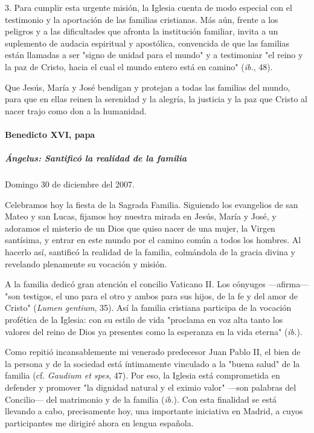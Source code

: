 \documentclass[]{article}
\let\oldparagraph\paragraph
\renewcommand{\paragraph}[1]{\oldparagraph{#1}\mbox{}}
\let\oldsubparagraph\subparagraph
\renewcommand{\subparagraph}[1]{\oldsubparagraph{#1}\mbox{}}
\begin{document}
3. Para cumplir esta urgente misión, la Iglesia cuenta de modo especial
con el testimonio y la aportación de las familias cristianas. Más aún,
frente a los peligros y a las dificultades que afronta la institución
familiar, invita a un suplemento de audacia espiritual y apostólica,
convencida de que las familias están llamadas a ser "signo de unidad
para el mundo" y a testimoniar "el reino y la paz de Cristo, hacia el
cual el mundo entero está en camino" (\emph{ib.}, 48).

Que Jesús, María y José bendigan y protejan a todas las familias del
mundo, para que en ellas reinen la serenidad y la alegría, la justicia y
la paz que Cristo al nacer trajo como don a la humanidad.

\paragraph{Benedicto XVI, papa}\label{benedicto-xvi-papa-6}

\subparagraph{Ángelus: Santificó la realidad de la
familia}\label{uxe1ngelus-santificuxf3-la-realidad-de-la-familia}

Domingo 30 de diciembre del 2007.

Celebramos hoy la fiesta de la Sagrada Familia. Siguiendo los evangelios
de san Mateo y san Lucas, fijamos hoy nuestra mirada en Jesús, María y
José, y adoramos el misterio de un Dios que quiso nacer de una mujer, la
Virgen santísima, y entrar en este mundo por el camino común a todos los
hombres. Al hacerlo así, santificó la realidad de la familia, colmándola
de la gracia divina y revelando plenamente su vocación y misión.

A la familia dedicó gran atención el concilio Vaticano II. Los cónyuges
---afirma--- "son testigos, el uno para el otro y ambos para sus hijos,
de la fe y del amor de Cristo" (\emph{Lumen gentium}, 35). Así la
familia cristiana participa de la vocación profética de la Iglesia: con
su estilo de vida "proclama en voz alta tanto los valores del reino de
Dios ya presentes como la esperanza en la vida eterna" (\emph{ib.}).

Como repitió incansablemente mi venerado predecesor Juan Pablo II, el
bien de la persona y de la sociedad está íntimamente vinculado a la
"buena salud" de la familia (cf. \emph{Gaudium et spes}, 47). Por eso,
la Iglesia está comprometida en defender y promover "la dignidad natural
y el eximio valor" ---son palabras del Concilio--- del matrimonio y de
la familia (\emph{ib.}). Con esta finalidad se está llevando a cabo,
precisamente hoy, una importante iniciativa en Madrid, a cuyos
participantes me dirigiré ahora en lengua española.
\end{document}
